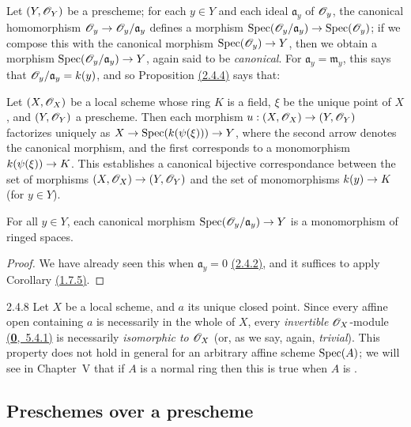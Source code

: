 Let $(Y,\mathscr{O}_Y)$ be a prescheme; for each $y\in Y$ and each ideal
$\mathfrak{a}_y$ of $\mathscr{O}_y$, the canonical homomorphism
$\mathscr{O}_y\to\mathscr{O}_y/\mathfrak{a}_y$ defines a morphism
${\mathop{\mathrm{Spec}}\nolimits}(\mathscr{O}_y/\mathfrak{a}_y)\to{\mathop{\mathrm{Spec}}\nolimits}(\mathscr{O}_y)$; if we compose this with the
canonical morphism ${\mathop{\mathrm{Spec}}\nolimits}(\mathscr{O}_y)\to Y$, then we obtain a morphism
${\mathop{\mathrm{Spec}}\nolimits}(\mathscr{O}_y/\mathfrak{a}_y)\to Y$, again said to be \textit{canonical}. For
$\mathfrak{a}_y=\mathfrak{m}_y$, this says that $\mathscr{O}_y/\mathfrak{a}_y=k(y)$, and
so Proposition \hyperref[prop-1.2.4.4]{(2.4.4)} says that:

\begin{cor}[2.4.6]
\label{cor-1.2.4.6}
Let $(X,\mathscr{O}_X)$ be a local scheme whose ring $K$ is a field, $\xi$ be the unique point of
$X$, and $(Y,\mathscr{O}_Y)$ a prescheme. Then each morphism $u:(X,\mathscr{O}_X)\to(Y,\mathscr{O}_Y)$ factorizes
uniquely as $X\to{\mathop{\mathrm{Spec}}\nolimits}(k(\psi(\xi)))\to Y$, where the second arrow denotes the canonical
morphism, and the first corresponds to a monomorphism $k(\psi(\xi))\to K$.
This establishes a canonical bijective correspondance between the set of
morphisms $(X,\mathscr{O}_X)\to (Y,\mathscr{O}_Y)$ and the set of monomorphisms $k(y)\to K$ (for
$y\in Y$).
\end{cor}

\begin{cor}[2.4.7]
\label{cor-1.2.4.7}
For all $y\in Y$, each canonical morphism
${\mathop{\mathrm{Spec}}\nolimits}(\mathscr{O}_y/\mathfrak{a}_y)\to Y$ is a monomorphism of ringed spaces.
\end{cor}

\begin{proof}
\label{proof-cor-1.2.4.7}
We have already seen this when $\mathfrak{a}_y=0$ \hyperref[prop-1.2.4.2]{(2.4.2)}, and it suffices
to apply Corollary \hyperref[cor-1.1.7.5]{(1.7.5)}.
\end{proof}

\begin{rmk}{2.4.8}
\label{rmk-1.2.4.8}
Let $X$ be a local scheme, and $a$ its unique
closed point. Since every affine open containing $a$ is necessarily in the
whole of $X$, every {\it invertible} $\mathscr{O}_X$-module \hyperref[env-0.5.4.1]{(\textbf{0},~5.4.1)} is
necessarily {\it isomorphic to $\mathscr{O}_X$} (or, as we say, again, {\it trivial}).
This property does not hold in general for an arbitrary affine scheme
${\mathop{\mathrm{Spec}}\nolimits}(A)$; we will see in Chapter~V that if $A$ is a normal ring then this is
true when $A$ is .
\end{rmk}

\subsection{Preschemes over a prescheme}
\label{subsection-preschemes-over-prescheme}

